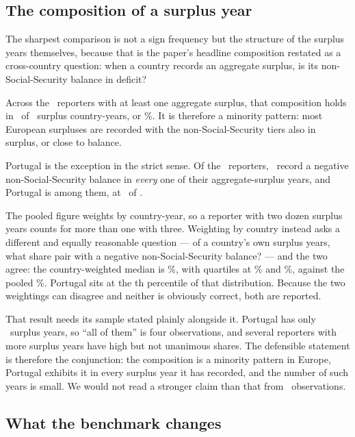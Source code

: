 \subsection{The composition of a surplus year}

The sharpest comparison is not a sign frequency but the structure of the surplus years
themselves, because that is the paper's headline composition restated as a
cross-country question: when a country records an aggregate surplus, is its
non-Social-Security balance in deficit?

Across the \CountriesWithSurplus\ reporters with at least one aggregate surplus, that
composition holds in \SurplusYearsOffsetting\ of \SurplusYearsTotal\ surplus
country-years, or \SurplusOffsettingShare\%. It is therefore a minority pattern: most
European surpluses are recorded with the non-Social-Security tiers also in surplus, or
close to balance.

Portugal is the exception in the strict sense. Of the \CountriesWithSurplus\ reporters,
\CountriesAllOffsetting\ record a negative non-Social-Security balance in \emph{every}
one of their aggregate-surplus years, and Portugal is among them, at
\PtSurplusOffsetting\ of \PtSurplusYears.

The pooled figure weights by country-year, so a reporter with two dozen surplus years
counts for more than one with three. Weighting by country instead asks a different and
equally reasonable question --- of a country's own surplus years, what share pair with a
negative non-Social-Security balance? --- and the two agree: the country-weighted median
is \SurplusCountryMedian\%, with quartiles at \SurplusCountryLowerQuartile\% and
\SurplusCountryUpperQuartile\%, against the pooled \SurplusOffsettingShare\%. Portugal
sits at the \SurplusCountryPercentile th percentile of that distribution. Because the two
weightings can disagree and neither is obviously correct, both are reported.

That result needs its sample stated plainly alongside it. Portugal has only
\PtSurplusYears\ surplus years, so ``all of them'' is four observations, and several
reporters with more surplus years have high but not unanimous shares. The defensible
statement is therefore the conjunction: the composition is a minority pattern in Europe,
Portugal exhibits it in every surplus year it has recorded, and the number of such years
is small. We would not read a stronger claim than that from
\PtSurplusYears\ observations.

\subsection{What the benchmark changes}


